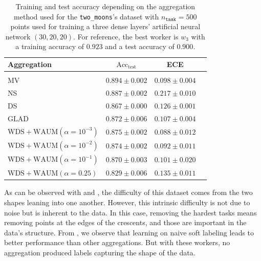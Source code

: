 \begin{table}[H]
    \centering
    \caption{Training and test accuracy depending on the aggregation method used for the \texttt{two\_moons}'s dataset with $n_\texttt{task}=500$ points used for training a three dense layers' artificial neural network $(30, 20, 20)$. For reference, the best worker is $w_3$ with a training accuracy of $0.923$ and a test accuracy of $0.900$. }
        \begin{tabular}{lccc}
            Aggregation                                  & $\mathrm{Acc}_{\text{test}}$ & ECE
            \\ \hline \\
            MV                                                           & $\mathbf{0.894\pm 0.002}$    & $\mathbf{0.098}\pm 0.004$ \\
            NS                                                             & $0.887\pm 0.002$    & $0.217\pm 0.010$          \\
            DS                                                         & $0.867\pm 0.000$             & $0.126\pm 0.001$          \\
            $\mathrm{GLAD}$                                                  & $0.872\pm 0.006$             & $0.107\pm 0.004$          \\
             \rowcolor{gray!20}$\mathrm{WDS}+\mathrm{WAUM}(\alpha=10^{-3}) $                     & $0.875\pm 0.002$             & $0.088\pm 0.012$ \\
             \rowcolor{gray!20}$\mathrm{WDS}+\mathrm{WAUM}(\alpha=10^{-2})$                  & $0.874\pm 0.002$             & $0.092\pm 0.011$ \\
             \rowcolor{gray!20}$\mathrm{WDS}+\mathrm{WAUM}(\alpha=10^{-1})$                    & $0.870\pm 0.003$             & $0.101\pm 0.020$          \\
             \rowcolor{gray!20}$\mathrm{WDS}+\mathrm{WAUM}(\alpha=0.25)$                     & $0.829\pm 0.006$             & $0.135\pm 0.011$          \\
        \end{tabular}
    \label{tab:results_simu_moons}
\end{table}
As can be observed with  and , the difficulty of this dataset comes from the two shapes leaning into one another.
However, this intrinsic difficulty is not due to noise but is inherent to the data.
In this case, removing the hardest tasks means removing points at the edges of the crescents, and those are important in the data's structure.
From , we observe that learning on naive soft labeling leads to better performance than other aggregations.
But with these workers, no aggregation produced labels capturing the shape of the data.

